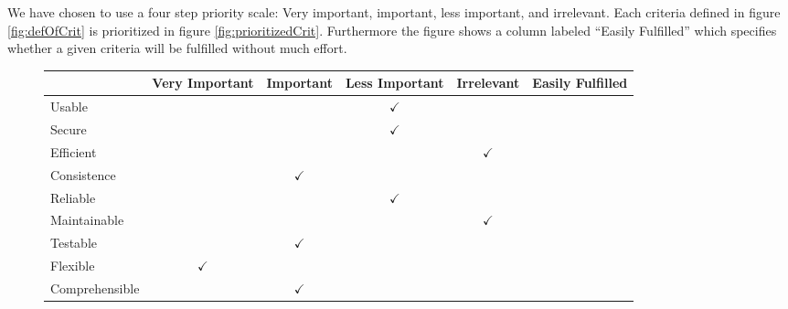 We have chosen to use a four step priority scale: Very important, important, less important, and irrelevant.
Each criteria defined in figure \ref{fig:defOfCrit} is prioritized in figure \ref{fig:prioritizedCrit}. Furthermore the figure shows a column labeled ``Easily Fulfilled''
which specifies whether a given criteria will be fulfilled without much effort.

\begin{figure}[h]
	\centering
		\begin{tabular}{| l | m{} | m{}| m{}| m{}|m{}|} \hline
												& Very  Important 												& Important 														& Less Important 											& Irrelevant 												& Easily Fulfilled 									\\ \hline
		Usable  						& 																				& 												& \multicolumn{1}{c|}{$\checkmark$}		& 																	& 																	\\ \hline
		Secure  						& 																				& 																			& \multicolumn{1}{c|}{$\checkmark$} 	& 																	& 																	\\ \hline
		Efficient 					& 																				& 																			& 																		& \multicolumn{1}{c|}{$\checkmark$} & 																	\\ \hline
		Consistence  				& 																				& \multicolumn{1}{c|}{$\checkmark$} 		& 																		& 																	& 																	\\ \hline
		Reliable  					& 																				& 																			& \multicolumn{1}{c|}{$\checkmark$} 	& 																	& 																	\\ \hline
		Maintainable  			& 																				& 																			& 																		& \multicolumn{1}{c|}{$\checkmark$} & 																	\\ \hline
		Testable  					& 																				& \multicolumn{1}{c|}{$\checkmark$} 		& 																		& 																	& 																	\\ \hline
		Flexible  					& \multicolumn{1}{c|}{$\checkmark$} 			& 																			& 																		& 																	& 																	\\ \hline
		Comprehensible  		& 																				& \multicolumn{1}{c|}{$\checkmark$} 		& 																		& 																	& 																	\\ \hline

\end{tabular}
\end{figure}
